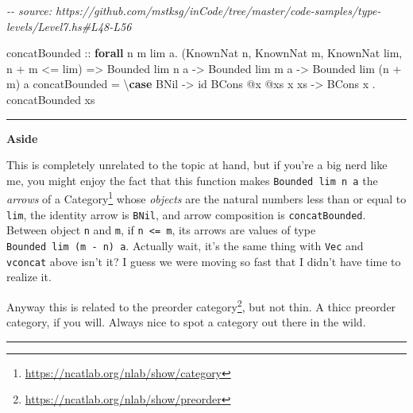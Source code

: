 \documentclass[]{article}
\newenvironment{Shaded}{}{}
\newcommand{\CommentTok}[1]{\textcolor[rgb]{0.38,0.63,0.69}{\textit{#1}}}
\newcommand{\DataTypeTok}[1]{\textcolor[rgb]{0.56,0.13,0.00}{#1}}
\newcommand{\FunctionTok}[1]{\textcolor[rgb]{0.02,0.16,0.49}{#1}}
\newcommand{\KeywordTok}[1]{\textcolor[rgb]{0.00,0.44,0.13}{\textbf{#1}}}
\newcommand{\NormalTok}[1]{#1}
\newcommand{\OperatorTok}[1]{\textcolor[rgb]{0.40,0.40,0.40}{#1}}
\newcommand{\OtherTok}[1]{\textcolor[rgb]{0.00,0.44,0.13}{#1}}
\renewcommand{\href}[2]{#2\footnote{\url{#1}}}
\begin{document}
\begin{Shaded}
\begin{Highlighting}[]
\CommentTok{{-}{-} source: https://github.com/mstksg/inCode/tree/master/code{-}samples/type{-}levels/Level7.hs\#L48{-}L56}

\OtherTok{concatBounded ::}
  \KeywordTok{forall}\NormalTok{ n m lim a}\OperatorTok{.}
\NormalTok{  (}\DataTypeTok{KnownNat}\NormalTok{ n, }\DataTypeTok{KnownNat}\NormalTok{ m, }\DataTypeTok{KnownNat}\NormalTok{ lim, n }\OperatorTok{+}\NormalTok{ m }\OperatorTok{\textless{}=}\NormalTok{ lim) }\OtherTok{=\textgreater{}}
  \DataTypeTok{Bounded}\NormalTok{ lim n a }\OtherTok{{-}\textgreater{}}
  \DataTypeTok{Bounded}\NormalTok{ lim m a }\OtherTok{{-}\textgreater{}}
  \DataTypeTok{Bounded}\NormalTok{ lim (n }\OperatorTok{+}\NormalTok{ m) a}
\NormalTok{concatBounded }\OtherTok{=}\NormalTok{ \textbackslash{}}\KeywordTok{case}
  \DataTypeTok{BNil} \OtherTok{{-}\textgreater{}} \FunctionTok{id}
  \DataTypeTok{BCons} \OperatorTok{@}\NormalTok{x }\OperatorTok{@}\NormalTok{xs x xs }\OtherTok{{-}\textgreater{}} \DataTypeTok{BCons}\NormalTok{ x }\OperatorTok{.}\NormalTok{ concatBounded xs}
\end{Highlighting}
\end{Shaded}

\begin{center}\rule{0.5\linewidth}{0.5pt}\end{center}

\textbf{Aside}

This is completely unrelated to the topic at hand, but if you're a big nerd like
me, you might enjoy the fact that this function makes
\texttt{Bounded\ lim\ n\ a} the \emph{arrows} of a
\href{https://ncatlab.org/nlab/show/category}{Category} whose \emph{objects} are
the natural numbers less than or equal to \texttt{lim}, the identity arrow is
\texttt{BNil}, and arrow composition is \texttt{concatBounded}. Between object
\texttt{n} and \texttt{m}, if \texttt{n\ \textless{}=\ m}, its arrows are values
of type \texttt{Bounded\ lim\ (m\ -\ n)\ a}. Actually wait, it's the same thing
with \texttt{Vec} and \texttt{vconcat} above isn't it? I guess we were moving so
fast that I didn't have time to realize it.

Anyway this is related to the
\href{https://ncatlab.org/nlab/show/preorder}{preorder category}, but not thin.
A thicc preorder category, if you will. Always nice to spot a category out there
in the wild.

\begin{center}\rule{0.5\linewidth}{0.5pt}\end{center}
\end{document}
